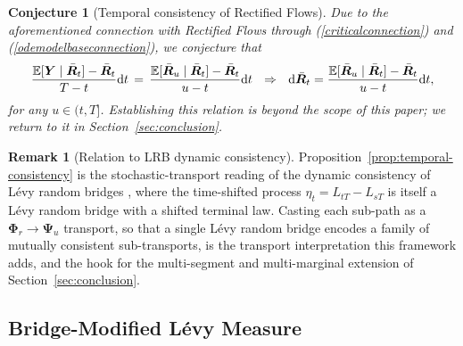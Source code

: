 \documentclass{article}
\newtheorem{conj}[thm]{Conjecture}
\newcommand{\levy}{{L\'evy }}
\theoremstyle{definition}
\newtheorem{remark}[proposition]{Remark}
\begin{document}
\begin{conj}[Temporal consistency of Rectified Flows]
\label{conj:rf-consistency}
Due to the aforementioned connection with Rectified Flows through (\ref{criticalconnection}) and (\ref{odemodelbaseconnection}), we conjecture that
\begin{equation}
    \frac{\mathbb{E}[\boldsymbol{Y} \mid \bar{\boldsymbol{R}}_t] - \bar{\boldsymbol{R}}_t}{T-t}\mathrm{d}t \, = \, \frac{\mathbb{E}[\bar{\boldsymbol{R}}_u \mid \bar{\boldsymbol{R}}_t] - \bar{\boldsymbol{R}}_t}{u-t}\mathrm{d}t \,\,\,\, \Rightarrow \,\,\,\, \mathrm{d}\bar{\boldsymbol{R}}_t = \frac{\mathbb{E}[\bar{\boldsymbol{R}}_u \mid \bar{\boldsymbol{R}}_t] - \bar{\boldsymbol{R}}_t}{u-t}\mathrm{d}t, \notag
\end{equation}
for any $u\in(t,T]$. Establishing this relation is beyond the scope of this paper; we return to it in Section~\ref{sec:conclusion}.
\end{conj}

\begin{remark}[Relation to LRB dynamic consistency]
Proposition~\ref{prop:temporal-consistency} is the stochastic-transport reading of the dynamic
consistency of \levy random bridges \cite[Section~2.7, Corollary~2.12]{hoylehughstonmacrina_2011},
where the time-shifted process $\eta_t=L_{tT}-L_{sT}$ is itself a \levy random bridge with a shifted
terminal law. Casting each sub-path as a $\boldsymbol{\Phi}_r\!\to\!\boldsymbol{\Psi}_u$ transport, so
that a single \levy random bridge encodes a family of mutually consistent sub-transports, is the
transport interpretation this framework adds, and the hook for the multi-segment and multi-marginal
extension of Section~\ref{sec:conclusion}.
\end{remark}

\subsection{Bridge-Modified \levy Measure}\label{sec:modified-levy}
\label{sec:explicit_M}
\end{document}
